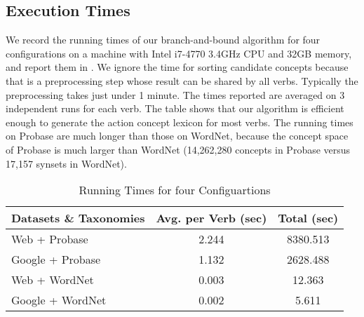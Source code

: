 \subsection{Execution Times}
\label{sec:efficiency}
We record the running times of our branch-and-bound algorithm
for four configurations on a machine with Intel i7-4770 3.4GHz
CPU and 32GB memory, and report them in .
We ignore the time for sorting candidate concepts because that
is a preprocessing step whose result can be shared by all verbs.
Typically the preprocessing takes just under 1 minute.
The times reported are averaged on 3 independent runs for each verb.
The table shows that our algorithm is
efficient enough to generate the action concept lexicon for most verbs.
The running times on Probase are much longer than those on WordNet,
because the concept space of Probase is much larger than WordNet
(14,262,280 concepts in Probase versus 17,157 synsets in WordNet).
\begin{table}[th]
\centering
\caption{Running Times for four Configuartions}
\begin{tabular}{|l|c|c|} \hline
Datasets \& Taxonomies  & Avg. per Verb (sec) & Total (sec) \\ \hline \hline
Web + Probase &	2.244	& 8380.513 \\ \hline
Google + Probase & 1.132 &	2628.488\\ \hline
Web + WordNet&	0.003 &	12.363\\  \hline
Google + WordNet &	0.002	& 5.611	\\ \hline
\end{tabular}
\label{tab:time}
\end{table}
\vspace{-2mm} 
